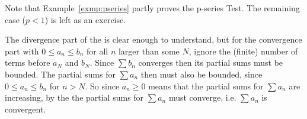 Note that Example~\ref{exmp:pseries} partly proves the p-series Test. The remaining
case ($p < 1$) is left as an exercise.



The divergence part of the  is clear enough to understand, but
for the convergence part with $0 \le a_n \le b_n$ for all $n$ larger than some
$N$, ignore the (finite) number of terms before $a_N$ and $b_N$. Since
$\sum b_n$ converges then its partial sums must be bounded. The partial sums for
$\sum a_n$ then must also be bounded, since $0 \le a_n \le b_n$ for $n > N$. So
since $a_n \ge 0$ means that the partial sums for $\sum a_n$ are increasing, by
the  the partial sums for $\sum a_n$ must converge, i.e.
$\sum a_n$ is convergent.

\newpage

